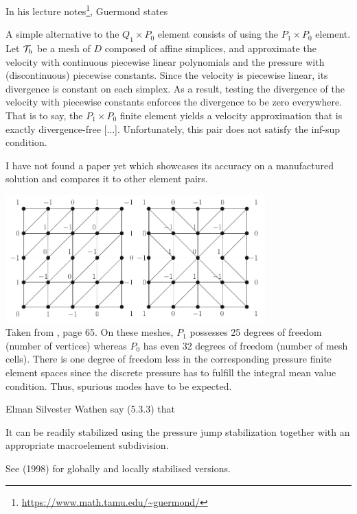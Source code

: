 
In his lecture notes\footnote{\url{https://www.math.tamu.edu/~guermond/}}, 
Guermond states 
\begin{displayquote}
{\color{darkgray}
A simple alternative to the 
$Q_1\times P_0$ element consists of using the $P_1\times P_0$ element.
Let ${\cal T}_h$  be a mesh of $D$ composed of affine simplices, and approximate the 
velocity with continuous piecewise linear polynomials and the pressure with
(discontinuous) piecewise constants. Since the velocity is piecewise linear, its
divergence is constant on each simplex. As a result, testing the divergence
of the velocity with piecewise constants enforces the divergence to be zero
everywhere. That is to say, the $P_1\times P_0$ finite element yields a velocity 
approximation that is exactly divergence-free [...]. Unfortunately,
this pair does not satisfy the inf-sup condition.}
\end{displayquote}

I have not found a paper yet which showcases its accuracy on a manufactured solution
and compares it to other element pairs.


\begin{center}
\includegraphics[width=10cm]{images/pair_p1p0/john16}\\
{\captionfont Taken from \textcite{john16}, page 65.
On these meshes, $P_1$ possesses 25 degrees of freedom (number of vertices) whereas $P_0$ has
even 32 degrees of freedom (number of mesh cells). There is one degree of freedom
less in the corresponding pressure finite element spaces since the discrete pressure
has to fulfill the integral mean value condition. Thus, spurious modes have to be
expected.
}
\end{center}



Elman Silvester Wathen say (5.3.3) that 
\begin{displayquote}
{\color{darkgray}
It can be readily stabilized using the pressure jump
stabilization together with an appropriate macroelement subdivision.}
\end{displayquote}
See \textcite{nosi98} (1998) for globally and locally stabilised versions.

